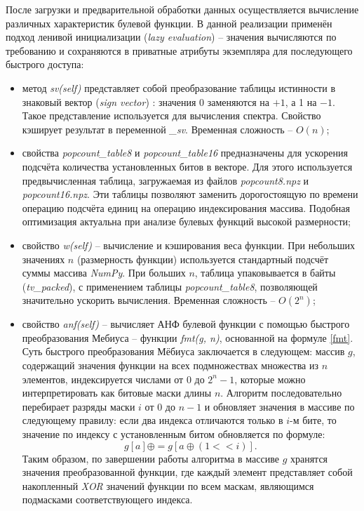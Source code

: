 После загрузки и предварительной обработки данных осуществляется вычисление различных характеристик булевой функции. В данной реализации применён подход ленивой инициализации (\textit{lazy evaluation}) – значения вычисляются по требованию и сохраняются в приватные атрибуты экземпляра для последующего быстрого доступа:
\begin{itemize}
    \item метод \textit{sv(self)} представляет собой преобразование таблицы истинности в знаковый вектор (\textit{sign vector}) : значения 0 заменяются на $+1$, а 1 на $-1$. Такое представление используется для вычисления спектра. Свойство кэширует результат в переменной \textit{\_sv}. Временная сложность – $O(n)$;
    \item свойства \textit{popcount\_table8} и \textit{popcount\_table16} предназначены для ускорения подсчёта количества установленных битов в векторе. Для этого используется предвычисленная таблица, загружаемая из файлов \textit{popcount8.npz} и \textit{popcount16.npz}. Эти таблицы позволяют заменить дорогостоящую по времени операцию подсчёта единиц на операцию индексирования массива. Подобная оптимизация актуальна при анализе булевых функций высокой размерности;
    \item свойство \textit{w(self)} – вычисление и кэширования веса функции. При небольших значениях $n$ (размерность функции) используется стандартный подсчёт суммы массива \textit{NumPy}. При больших $n$, таблица упаковывается в байты (\textit{tv\_packed}), с применением таблицы \textit{popcount\_table8}, позволяющей значительно ускорить вычисления. Временная сложность – $O(2^n)$;
    \item свойство \textit{anf(self)} – вычисляет АНФ булевой функции с помощью быстрого преобразования Мебиуса – функции \textit{fmt(g, n)}, основанной на формуле \eqref{fmt}. Суть быстрого преобразования Мёбиуса заключается в следующем: массив $g$, содержащий значения функции на всех подмножествах множества из $n$ элементов, индексируется числами от $0$ до $2^n-1$, которые можно интерпретировать как битовые маски длины $n$. Алгоритм последовательно перебирает разряды маски $i$ от $0$ до $n − 1$ и обновляет значения в массиве по следующему правилу: если два индекса отличаются только в $i$-м бите, то значение по индексу с установленным битом обновляется по формуле:
    \[
        g[a] \oplus= g[a \oplus(1 << i)].
    \]
    Таким образом, по завершении работы алгоритма в массиве $g$ хранятся значения преобразованной функции, где каждый элемент представляет собой накопленный \textit{XOR} значений функции по всем маскам, являющимся подмасками соответствующего индекса.


\end{itemize}

